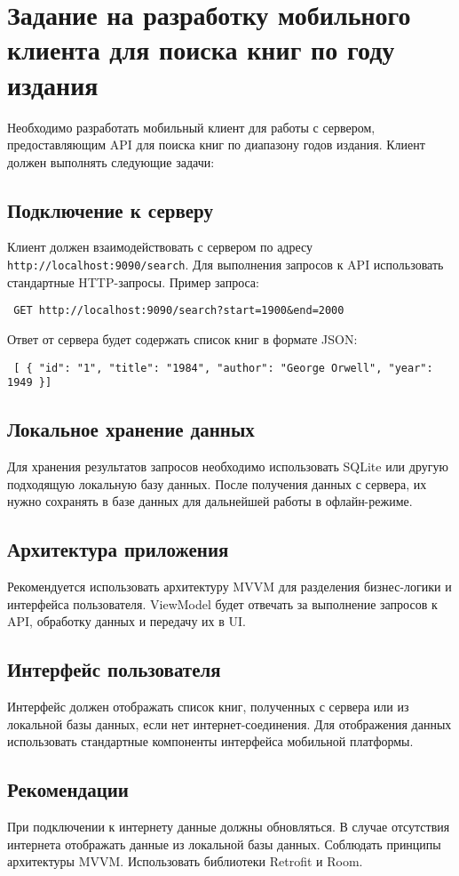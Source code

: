\section{Задание на разработку мобильного клиента для поиска книг по году издания}

Необходимо разработать мобильный клиент для работы с сервером, предоставляющим API для поиска книг по диапазону годов издания. Клиент должен выполнять следующие задачи:

\subsection{Подключение к серверу} Клиент должен взаимодействовать с сервером по адресу \texttt{http://localhost:9090/search}. Для выполнения запросов к API использовать стандартные HTTP-запросы. Пример запроса:

\begin{verbatim} GET http://localhost:9090/search?start=1900&end=2000 \end{verbatim}

Ответ от сервера будет содержать список книг в формате JSON:

\begin{verbatim} [ { "id": "1", "title": "1984", "author": "George Orwell", "year": 1949 }] \end{verbatim}

\subsection{Локальное хранение данных} Для хранения результатов запросов необходимо использовать SQLite или другую подходящую локальную базу данных. После получения данных с сервера, их нужно сохранять в базе данных для дальнейшей работы в офлайн-режиме.

\subsection{Архитектура приложения} Рекомендуется использовать архитектуру MVVM для разделения бизнес-логики и интерфейса пользователя. ViewModel будет отвечать за выполнение запросов к API, обработку данных и передачу их в UI.

\subsection{Интерфейс пользователя} Интерфейс должен отображать список книг, полученных с сервера или из локальной базы данных, если нет интернет-соединения. Для отображения данных использовать стандартные компоненты интерфейса мобильной платформы.

\subsection{Рекомендации}

При подключении к интернету данные должны обновляться.
В случае отсутствия интернета отображать данные из локальной базы данных.
Соблюдать принципы архитектуры MVVM.
Использовать библиотеки Retrofit и Room.